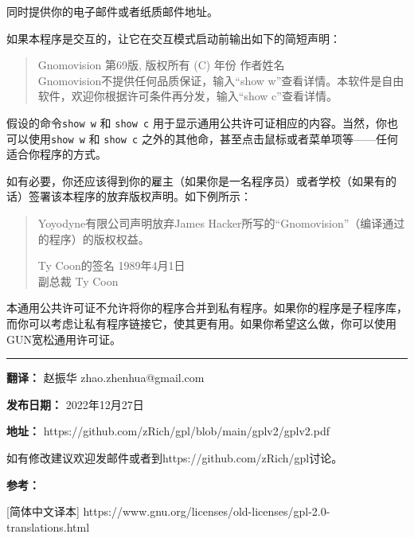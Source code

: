 \documentclass[11pt]{article}
\begin{document}
同时提供你的电子邮件或者纸质邮件地址。

如果本程序是交互的，让它在交互模式启动前输出如下的简短声明：


\begin{quote}
Gnomovision 第69版, 版权所有 (C) 年份  作者姓名 \\
Gnomovision不提供任何品质保证，输入“show w”查看详情。本软件是自由软件，欢迎你根据许可条件再分发，输入“show c”查看详情。
\end{quote}

假设的命令{\tt show w} 和 {\tt show c} 用于显示通用公共许可证相应的内容。当然，你也可以使用{\tt show w} 和 {\tt show c}
之外的其他命，甚至点击鼠标或者菜单项等——任何适合你程序的方式。

如有必要，你还应该得到你的雇主（如果你是一名程序员）或者学校（如果有的话）签署该本程序的放弃版权声明。如下例所示：

\begin{quote}
  Yoyodyne有限公司声明放弃James Hacker所写的“Gnomovision”（编译通过的程序）的版权权益。


  Ty Coon的签名 1989年4月1日 \\
  副总裁 Ty Coon
\end{quote}

本通用公共许可证不允许将你的程序合并到私有程序。如果你的程序是子程序库，而你可以考虑让私有程序链接它，使其更有用。如果你希望这么做，你可以使用GUN宽松通用许可证。

\noindent\rule{\textwidth}{0.4pt}

\textbf{翻译：} 赵振华 zhao.zhenhua@gmail.com

\textbf{发布日期：} 2022年12月27日

\textbf{地址：} https://github.com/zRich/gpl/blob/main/gplv2/gplv2.pdf

如有修改建议欢迎发邮件或者到https://github.com/zRich/gpl讨论。

\textbf{参考：} 

[简体中文译本] https://www.gnu.org/licenses/old-licenses/gpl-2.0-translations.html
\end{document}
